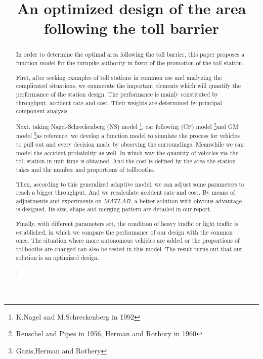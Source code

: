 \documentclass{mcmthesis}
\title{An optimized design of the area following the toll barrier }
\begin{document}
	
	
\begin{abstract}
	
In order to determine the optimal area following the toll barrier, this paper proposes a function model for the turnpike authority in favor of the promotion of the toll station.

First, after seeking examples of toll stations in common use and analyzing the complicated situations, we enumerate the important elements which will quantify the performance of the station design. The performance is mainly constituted by throughput, accident rate and cost. Their weights are determined by principal component analysis. 

Next, taking  Nagel-Schreckenberg (NS) model \footnote{K.Nagel and M.Schreckenberg in 1992}, car following (CF) model \footnote{Reuschel and Pipes in 1956, Herman and Rothory in 1960}and GM model \footnote{Gazis,Herman and Rothery}as reference, we  develop a function model to simulate the process for vehicles to pull out and every decision made by observing the surroundings. Meanwhile we can model the accident probability as well. In which way the quantity of vehicles via the toll station in unit time is obtained. And the cost is defined by the area the station takes and the number and proportions of tollbooths. 

Then, according to this generalized adaptive model, we can adjust some parameters to reach a bigger throughput. And we recalculate accident rate and cost. By means of adjustments and experiments on $MATLAB$, a better solution with obvious advantage is designed. Its size, shape and merging pattern are detailed in our report.

Finally, with different parameters set, the condition of heavy traffic or light traffic is established, in which we compare the performance of our design with the common ones. The situation where more autonomous vehicles are added or the proportions of tollbooths are changed can also be tested in this model. The result turns out that our solution is an optimized design.

   
  
  
  
\begin{keywords}
;
\end{keywords}
\end{abstract}

\maketitle
\tableofcontents
\clearpage
\end{document}
